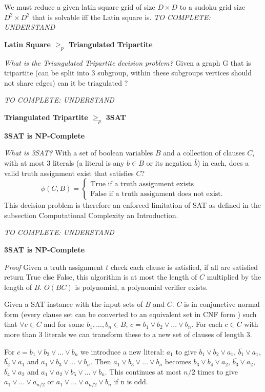 \documentclass[a4paper,12pt]{article}
\begin{document}
We must reduce a given latin square grid of size $D \times D$ to a sudoku grid size $D^2 \times D^2$ that is solvable iff the Latin square is. \textit{TO COMPLETE: UNDERSTAND \cite{Complexity}}

\textbf{Latin Square $\geq_p$ Triangulated Tripartite}

\textit{What is the Triangulated Tripartite decision problem?} Given a graph G that is tripartite (can be split into 3 subgroup, within these subgroups vertices should not share edges) can it be triagulated ?


 \textit{TO COMPLETE: UNDERSTAND \cite{latin to tripartite}}

\textbf{Triangulated Tripartite $\geq_p$ 3SAT}

\textbf{3SAT is NP-Complete}

\textit{What is 3SAT?} With a set of boolean variables $B$ and a collection of clauses $C$, with at most 3 literals (a literal is any $b \in B$ or its negation $\bar{b}$) in each, does a valid truth assignment exist that satisfies $C$?
		\begin{equation}
		        \phi (C,B) = \begin{cases}
		            \text{True if a truth assignment exists} \\
		            \text{False if a truth assignment does not exist}.
				\end{cases}
		\end{equation}
This decision problem is therefore an enforced limitation of SAT as defined in the subsection Computational Complexity an Introduction.

 \textit{TO COMPLETE: UNDERSTAND \cite{tripartite to sat}}

\textbf{3SAT is NP-Complete}

\textit{Proof}
Given a truth assignment $t$ check each clause is satisfied, if all are satisfied return True else False, this algorithm is at most the length of $C$ multiplied by the length of $B$. $O(BC)$ is polynomial, a polynomial verifier exists. 

Given a SAT instance with the input sets of $B$ and $C$. $C$ is in conjunctive normal form (every clause set can be converted to an equivalent set in CNF form \cite{CNF}) such that $\forall c \in C$ and for some $b_1, ... ,b_n \in B$, $c = b_1 \lor b_2 \lor ... \lor b_n$. For each $c \in C$ with more than 3 literals we can transform these to a new set of clauses of length 3. 

For $c = b_1 \lor b_2 \lor ... \lor b_n$ we introduce a new literal: $a_1$ to give $b_1 \lor b_2 \lor a_1$, $\bar{b_1} \lor a_1$, $\bar{b_2} \lor a_1$ and $a_1 \lor b_3 \lor ... \lor b_n$. Then $a_1 \lor b_3 \lor ... \lor b_n$ becomes $b_3 \lor b_4 \lor a_2$, $\bar{b_3} \lor a_2$, $\bar{b_4} \lor a_2$ and $a_1 \lor a_2 \lor b_5 \lor ... \lor b_n$. This continues at most $n/2$ times to give $a_1 \lor ... \lor a_{n/2}$ or $a_1 \lor ... \lor a_{n/2} \lor b_n$ if n is odd. 
\end{document}
